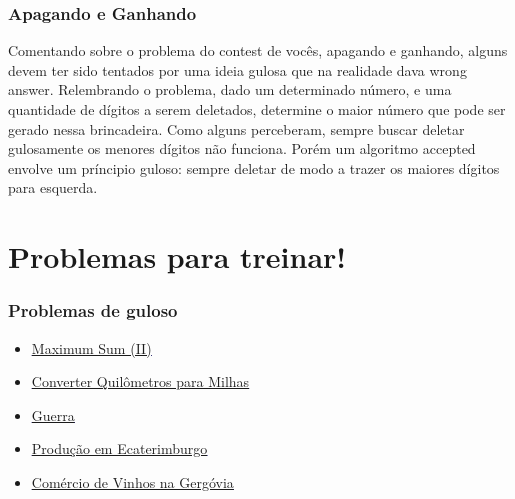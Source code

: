 \documentclass{beamer}
\begin{document}
	\begin{frame}
	\frametitle{Apagando e Ganhando}
		Comentando sobre o problema do contest de vocês,
		apagando e ganhando, alguns devem ter sido tentados por uma
		ideia gulosa que na realidade dava wrong answer. Relembrando
		o problema, dado um determinado número, e uma quantidade
		de dígitos a serem deletados, determine o maior número que
		pode ser gerado nessa brincadeira. Como alguns perceberam,
		sempre buscar deletar gulosamente os menores dígitos não
		funciona. Porém um algoritmo accepted envolve um príncipio
		guloso: sempre deletar de modo a trazer os maiores dígitos para
		esquerda.
	\end{frame}

	\section{Problemas para treinar!}

	\begin{frame}
	\frametitle{Problemas de guloso}
	\begin{itemize}
	\item \textcolor{blue}{\underline{\href{https://onlinejudge.org/index.php?option=com_onlinejudge&Itemid=8&page=show_problem&problem=1597}{Maximum Sum (II)}}}
	\item \textcolor{blue}{\underline{\href{https://www.urionlinejudge.com.br/judge/pt/problems/view/1643}{Converter Quilômetros para Milhas}}}
	\item \textcolor{blue}{\underline{\href{https://www.urionlinejudge.com.br/judge/pt/problems/view/2095}{Guerra}}}
	\item \textcolor{blue}{\underline{\href{https://www.urionlinejudge.com.br/judge/pt/problems/view/2115}{Produção em Ecaterimburgo}}}
	\item \textcolor{blue}{\underline{\href{https://www.urionlinejudge.com.br/judge/pt/problems/view/1661}{Comércio de Vinhos na Gergóvia}}}
	\end{itemize}
	\end{frame}
\end{document}
